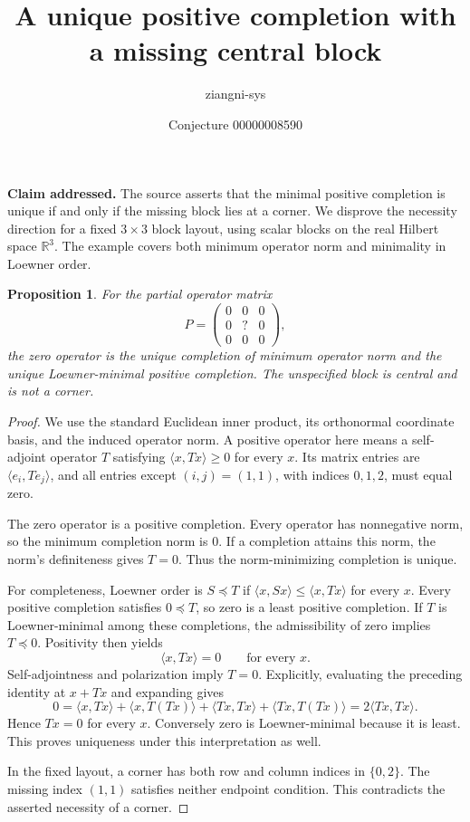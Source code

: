 \documentclass[11pt]{article}
\title{A unique positive completion with a missing central block}
\author{ziangni-sys}
\date{Conjecture 00000008590}
\newtheorem{proposition}{Proposition}
\begin{document}
\maketitle
\noindent\textbf{Claim addressed.} The source asserts that the minimal positive completion is unique if and only if the missing block lies at a corner. We disprove the necessity direction for a fixed $3\times3$ block layout, using scalar blocks on the real Hilbert space $\mathbb R^3$. The example covers both minimum operator norm and minimality in Loewner order.

\begin{proposition}
For the partial operator matrix
\[
 P=\begin{pmatrix}0&0&0\\0&?&0\\0&0&0\end{pmatrix},
\]
the zero operator is the unique completion of minimum operator norm and the unique Loewner-minimal positive completion. The unspecified block is central and is not a corner.
\end{proposition}
\begin{proof}
We use the standard Euclidean inner product, its orthonormal coordinate basis, and the induced operator norm. A positive operator here means a self-adjoint operator $T$ satisfying $\langle x,Tx\rangle\geq0$ for every $x$. Its matrix entries are $\langle e_i,Te_j\rangle$, and all entries except $(i,j)=(1,1)$, with indices $0,1,2$, must equal zero.

The zero operator is a positive completion. Every operator has nonnegative norm, so the minimum completion norm is $0$. If a completion attains this norm, the norm's definiteness gives $T=0$. Thus the norm-minimizing completion is unique.

For completeness, Loewner order is $S\preceq T$ if $\langle x,Sx\rangle\leq\langle x,Tx\rangle$ for every $x$. Every positive completion satisfies $0\preceq T$, so zero is a least positive completion. If $T$ is Loewner-minimal among these completions, the admissibility of zero implies $T\preceq0$. Positivity then yields
\[
 \langle x,Tx\rangle=0\qquad\text{for every }x.
\]
Self-adjointness and polarization imply $T=0$. Explicitly, evaluating the preceding identity at $x+Tx$ and expanding gives
\[
 0=\langle x,Tx\rangle+\langle x,T(Tx)\rangle
     +\langle Tx,Tx\rangle+\langle Tx,T(Tx)\rangle
   =2\langle Tx,Tx\rangle.
\]
Hence $Tx=0$ for every $x$. Conversely zero is Loewner-minimal because it is least. This proves uniqueness under this interpretation as well.

In the fixed layout, a corner has both row and column indices in $\{0,2\}$. The missing index $(1,1)$ satisfies neither endpoint condition. This contradicts the asserted necessity of a corner.
\end{proof}
\end{document}
